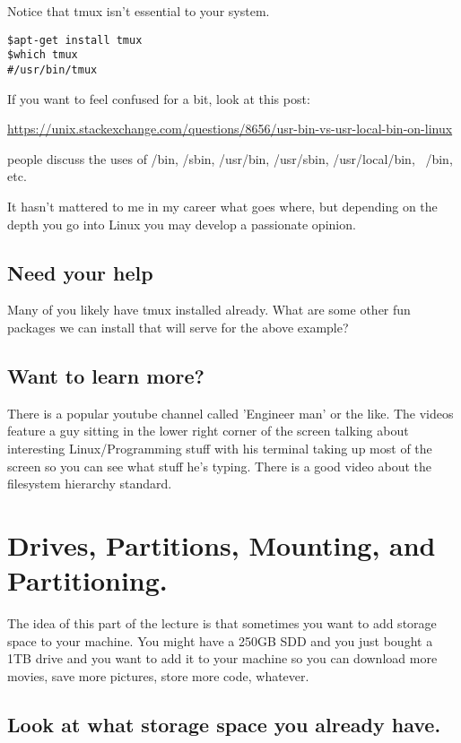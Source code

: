 \documentclass[10pt]{article}
\begin{document}
Notice that tmux isn't essential to your system. 

\begin{lstlisting}
$apt-get install tmux
$which tmux
#/usr/bin/tmux
\end{lstlisting}

If you want to feel confused for a bit, look at this post:

\url{https://unix.stackexchange.com/questions/8656/usr-bin-vs-usr-local-bin-on-linux}

people discuss the uses of /bin, /sbin, /usr/bin, /usr/sbin, /usr/local/bin, ~/bin, etc.

It hasn't mattered to me in my career what goes where, but depending on the depth you go into Linux you may develop a passionate opinion.


\subsection{Need your help}
Many of you likely have tmux installed already. What are some other fun packages we can install that will serve for the above example?

\subsection{Want to learn more?}
There is a popular youtube channel called 'Engineer man' or the like. The videos feature a guy sitting in the lower right corner of the screen talking about interesting Linux/Programming stuff with his terminal taking up most of the screen so you can see what stuff he's typing. There is a good video about the filesystem hierarchy standard.


\section{Drives, Partitions, Mounting, and Partitioning.}
The idea of this part of the lecture is that sometimes you want to add storage space to your machine. You might have a 250GB SDD and you just bought a 1TB drive and you want to add it to your machine so you can download more movies, save more pictures, store more code, whatever.

\subsection{Look at what storage space you already have.}
\end{document}
